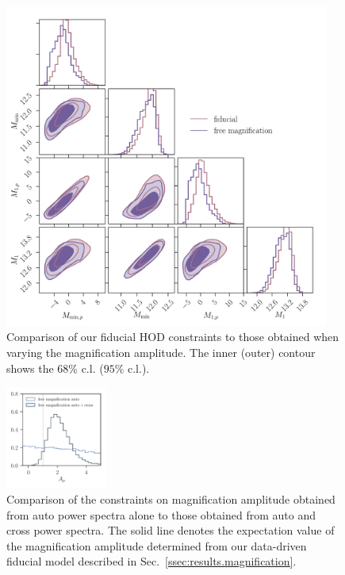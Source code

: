 \documentclass[a4paper,11pt]{article}
\begin{document}
    \begin{figure}
      \begin{center}
        \includegraphics[width=0.95\textwidth]{figures/contours-Mmin-M1_mPk=HOD_fix=alpha-fc-sigmaM_HOD=zevol_fit=pz-shifts+prior=0p2-pz-widths+prior=0p2_fit=auto+cross_cosmo=const-LINBIAS_HOD-param=zfid_clfit=HOD-zevol_no-mag-bias-vs-mag-bias-free.pdf}
        \caption{Comparison of our fiducial HOD constraints to those obtained when varying the magnification amplitude. The inner (outer) contour shows the $68 \%$ c.l. ($95 \%$ c.l.).}
        \label{fig:constraints-no-mag-bias-vs-fit=mag-bias-ampl}
      \end{center}
    \end{figure}

    \begin{figure}
      \begin{center}
        \includegraphics[width=0.3\textwidth]{figures/contours-A_mu_mPk=HOD_fix=alpha-fc-sigmaM_HOD=zevol_fit=pz-shifts+prior=0p2-pz-widths+prior=0p2_fit=auto+cross_cosmo=const-LINBIAS_HOD-param=zfid_clfit=HOD-zevol_mag-bias-free-fit=auto+cross-vs-mag-bias-free-fit=auto.pdf}
        \caption{Comparison of the constraints on magnification amplitude obtained from auto power spectra alone to those obtained from auto and cross power spectra. The solid line denotes the expectation value of the magnification amplitude determined from our data-driven fiducial model described in Sec.~\ref{ssec:results.magnification}.}
        \label{fig:constraints-fit=mag-bias-ampl_fit=auto+cross-vs-fit=mag-bias-ampl_fit=auto}
      \end{center}
    \end{figure}
\end{document}
